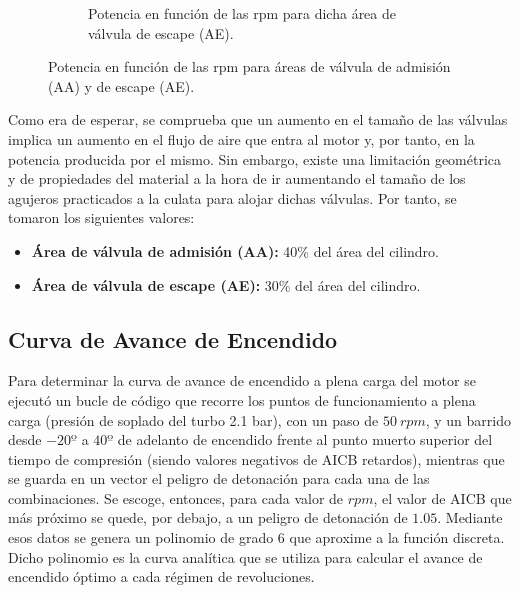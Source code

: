 \begin{figure}[H]
\begin{subfigure}[b]{0.45\textwidth}
        \caption{Potencia en función de las rpm para dicha área de válvula de escape (AE).}
        \label{fig:RPM_aval_escape}
    \end{subfigure}
    
    \caption{Potencia en función de las rpm para áreas de válvula de admisión (AA) y de escape (AE).}
    \label{fig:RPM_aval_combined}
\end{figure}

Como era de esperar, se comprueba que un aumento en el tamaño de las válvulas implica un aumento en el flujo de aire que entra al motor y, por tanto, en la potencia producida por el mismo. Sin embargo, existe una limitación geométrica y de propiedades del material a la hora de ir aumentando el tamaño de los agujeros practicados a la culata para alojar dichas válvulas. Por tanto, se tomaron los siguientes valores:

\begin{itemize}
   \item \textbf{Área de válvula de admisión (AA):} 40\%  del área del cilindro.
  \item \textbf{Área de válvula de escape (AE):} 30\%  del área del cilindro.
  \end{itemize}
  

\subsection{Curva de Avance de Encendido} \label{s:subsection_03}

Para determinar la curva de avance de encendido a plena carga del motor se ejecutó un bucle de código que recorre los puntos de funcionamiento a plena carga (presión de soplado del turbo 2.1 bar), con un paso de $50 \ rpm$, y un barrido desde $-20º$ a $40º$ de adelanto de encendido frente al punto muerto superior del tiempo de compresión (siendo valores negativos de AICB retardos), mientras que se guarda en un vector el peligro de detonación para cada una de las combinaciones. Se escoge, entonces, para cada valor de $rpm$, el valor de AICB que más próximo se quede, por debajo, a un peligro de detonación de $1.05$. Mediante esos datos se genera un polinomio de grado 6 que aproxime a la función discreta. Dicho polinomio es la curva analítica que se utiliza para calcular el avance de encendido óptimo a cada régimen de revoluciones.

